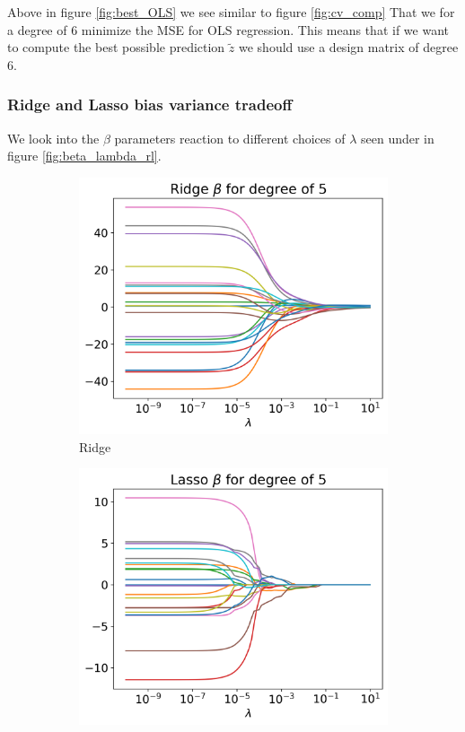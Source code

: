 \documentclass[12pt]{article}
\begin{document}
Above in figure \ref{fig:best_OLS} we see similar to figure \ref{fig:cv_comp} That we for a degree of 6 minimize the MSE for OLS regression. This means that if we want to compute the best possible prediction $\tilde{z}$ we should use a design matrix of degree 6.

\subsubsection{Ridge and Lasso bias variance tradeoff}
We look into the $\beta$ parameters reaction to different choices of $\lambda$ seen under in figure \ref{fig:beta_lambda_rl}.
\begin{figure}[H]
  \begin{subfigure}{.5\textwidth}
    \centering
    \includegraphics[width=\textwidth]{../figures/ridge_beta.png}
    \caption{Ridge}
    \label{fig:}
  \end{subfigure}
  \begin{subfigure}{.5\textwidth}
    \centering
    \includegraphics[width=\textwidth]{../figures/lasso_beta.png}

\end{subfigure}
\end{figure}
\end{document}
